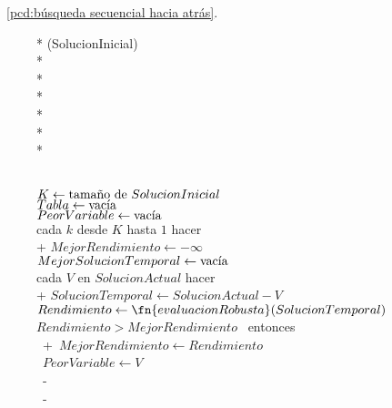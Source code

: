 \documentclass[conference,a4paper]{IEEEtran}
\begin{document}
\figurename~\ref{pcd:búsqueda secuencial hacia atrás}.
\begin{figure}
  \begin{pseudo}*
    (SolucionInicial) \\*
     \\*
     \\*
     \\*
     \\*
     \\*
    
     \\

    \( K \leftarrow \textnormal{tamaño de } SolucionInicial \) \\
    \( Tabla \leftarrow \textnormal{vacía} \) \\
    \( PeorVariable \leftarrow \textnormal{vacía} \) \\

    \por cada \( k \) \textnormal{ desde } \( K \) \textnormal{ hasta } \( 1 \) \textnormal{ hacer} \\+
        \( MejorRendimiento \leftarrow -\infty \) \\
        \( MejorSolucionTemporal \leftarrow \textnormal{vacía} \) \\

        \por cada \( V \) \textnormal{ en } \( SolucionActual \) \textnormal{ hacer} \\+
            \( SolucionTemporal \leftarrow SolucionActual - V \) \\
            \( Rendimiento \leftarrow \fn{evaluacionRobusta}(SolucionTemporal) \) \\

            \si \( Rendimiento > MejorRendimiento \) \textnormal{ entonces} \\+
                \( MejorRendimiento \leftarrow Rendimiento \) \\
                \( PeorVariable \leftarrow V \) \\-
        \fin \\-


\end{pseudo}
\end{figure}
\end{document}

